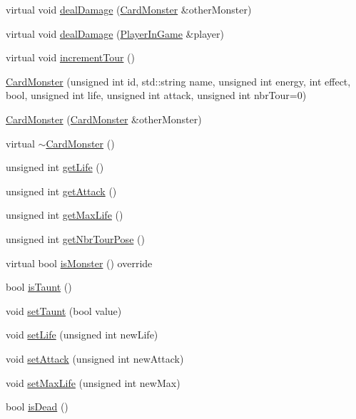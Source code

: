\begin{DoxyCompactItemize}
\item 
virtual void \hyperlink{classCardMonster_aaf28396b394a9400d257eddfa09e4567}{deal\+Damage} (\hyperlink{classCardMonster}{Card\+Monster} \&other\+Monster)
\item 
virtual void \hyperlink{classCardMonster_a829d68246c3af5f136cdf2cbc11284b0}{deal\+Damage} (\hyperlink{classPlayerInGame}{Player\+In\+Game} \&player)
\item 
virtual void \hyperlink{classCardMonster_a2d55cf30d111437486e2b1bacefcbf79}{increment\+Tour} ()
\item 
\hyperlink{classCardMonster_aff315735b920acc3cd0a6b909a4a3c25}{Card\+Monster} (unsigned int id, std\+::string name, unsigned int energy, int effect, bool, unsigned int life, unsigned int attack, unsigned int nbr\+Tour=0)
\item 
\hyperlink{classCardMonster_a5f577cbecdf0d1c6a6ccbc848793ddef}{Card\+Monster} (\hyperlink{classCardMonster}{Card\+Monster} \&other\+Monster)
\item 
virtual \hyperlink{classCardMonster_a7b23269cfbfb6df2eb7f28195b0994f0}{$\sim$\+Card\+Monster} ()
\item 
unsigned int \hyperlink{classCardMonster_a31df57dbefaefdedf87d7e35f2659233}{get\+Life} ()
\item 
unsigned int \hyperlink{classCardMonster_abf8d88a45f9ff97689e9ff32510ca7ee}{get\+Attack} ()
\item 
unsigned int \hyperlink{classCardMonster_aa205178cc69a1c9573557e5ed86beb50}{get\+Max\+Life} ()
\item 
unsigned int \hyperlink{classCardMonster_ab5253a6be95255f39f494326010aa4e5}{get\+Nbr\+Tour\+Pose} ()
\item 
virtual bool \hyperlink{classCardMonster_add70449c1bc34baee852fe07cc7d39cc}{is\+Monster} () override
\item 
bool \hyperlink{classCardMonster_adcac6e14fd885a63a872ef02e3f9472b}{is\+Taunt} ()
\item 
void \hyperlink{classCardMonster_a27de130e39afaf1855e3e6b644ab83c2}{set\+Taunt} (bool value)
\item 
void \hyperlink{classCardMonster_a8aeba0819ce64bf958d9b5ae1bceb61b}{set\+Life} (unsigned int new\+Life)
\item 
void \hyperlink{classCardMonster_aa27378a04c731a5a69d191314ace4144}{set\+Attack} (unsigned int new\+Attack)
\item 
void \hyperlink{classCardMonster_ad20bc2d69ddabeea8bab358a8e02500d}{set\+Max\+Life} (unsigned int new\+Max)
\item 
bool \hyperlink{classCardMonster_a48083f1dfbc22519fbc30ecab2cadfc3}{is\+Dead} ()
\end{DoxyCompactItemize}


